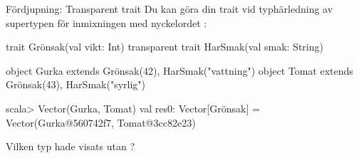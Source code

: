 \begin{Slide}{Fördjupning: Transparent trait}\SlideFontSmall
Du kan göra din trait  vid typhärledning av supertypen för inmixningen med nyckelordet :
\begin{Code}
trait Grönsak(val vikt: Int)
transparent trait HarSmak(val smak: String)

object Gurka extends Grönsak(42), HarSmak("vattning")
object Tomat extends Grönsak(43), HarSmak("syrlig")
\end{Code} 
\begin{REPLnonum}
scala> Vector(Gurka, Tomat)
val res0: Vector[Grönsak] = 
  Vector(Gurka@560742f7, Tomat@3cc82e23)
\end{REPLnonum}
Vilken typ hade visats utan ? \pause \\ 
\end{Slide}


